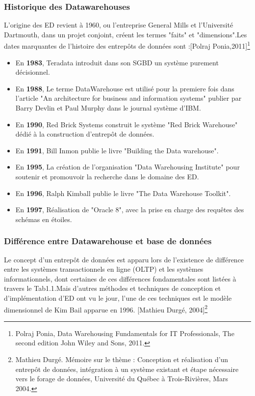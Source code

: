 \subsubsection{Historique des Datawarehouses}
L’origine des ED revient à 1960, ou l’entreprise General Mills et l’Université Dartmouth, dans un projet conjoint, créent les termes "faits" et "dimensions".Les dates marquantes de l’histoire des entrepôts de données sont :[Polraj Ponia,2011]\footnote{Polraj Ponia, Data Warehousing Fundamentals for IT Professionals, The second edition John Wiley and Sons, 2011.}
\begin{itemize}
    \item En \textbf{1983}, Teradata introduit dans son SGBD un système purement décisionnel.
    \item En \textbf{1988}, Le terme DataWarehouse est utilisé pour la premiere fois dans l’article "An architecture for business and information systems" publier par Barry Devlin et Paul Murphy dans le journal système d’IBM.
    \item En \textbf{1990}, Red Brick Systems construit le système "Red Brick Warehouse" dédié à la construction d’entrepôt de données.
    \item En \textbf{1991}, Bill Inmon publie le livre "Building the Data warehouse".
    \item En \textbf{1995}, La création de l’organisation "Data Warehousing Institute" pour soutenir et promouvoir la recherche dans le domaine des ED.
    \item En \textbf{1996}, Ralph Kimball publie le livre "The Data Warehouse Toolkit".
    \item En \textbf{1997}, Réalisation de "Oracle 8", avec la prise en charge des requêtes des schémas
    en étoiles.
\end{itemize}


\subsubsection{Différence entre Datawarehouse et base de données}
Le concept d’un entrepôt de données est apparu lors de l’existence de différence entre les systèmes transactionnels en ligne (OLTP) et les systèmes informationnels, dont certaines de ces différences fondamentales sont listées à travers le Tab1.1.Mais d’autres méthodes et techniques de conception et d’implémentation d’ED ont vu le jour, l’une de ces techniques est le modèle dimensionnel de Kim Bail apparue en 1996. [Mathieu Durgé, 2004]\footnote{Mathieu Durgé. Mémoire sur le thème : Conception et réalisation d’un entrepôt de données, intégration à un système existant et étape nécessaire vers le forage de données, Université du Québec à Trois-Rivières, Mars 2004.}

